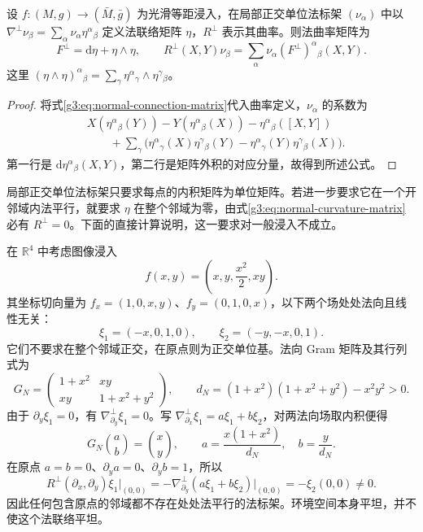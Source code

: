 \begin{proposition}\label{g3:prop:normal-curvature-matrix}
	设 \(f:(M,g)\to(\bar M,\bar g)\) 为光滑等距浸入，在局部正交单位法标架 \((\nu_\alpha)\) 中以 \(\nabla^\perp\nu_\beta=\sum_\alpha\nu_\alpha\eta^\alpha{}_\beta\) 定义法联络矩阵 \(\eta\)，\(R^\perp\) 表示其曲率。则法曲率矩阵为
	\begin{equation}\label{g3:eq:normal-curvature-matrix}
		F^\perp=\mathrm d\eta+\eta\wedge\eta,\qquad
		R^\perp(X,Y)\nu_\beta
			=\sum_\alpha\nu_\alpha(F^\perp)^\alpha{}_\beta(X,Y).
	\end{equation}
	这里 \((\eta\wedge\eta)^\alpha{}_\beta
	=\sum_\gamma\eta^\alpha{}_\gamma\wedge\eta^\gamma{}_\beta\)。
\end{proposition}
\begin{proof}
	将式\eqref{g3:eq:normal-connection-matrix}代入曲率定义，\(\nu_\alpha\) 的系数为
	\[
		\begin{aligned}
			&X(\eta^\alpha{}_\beta(Y))
				-Y(\eta^\alpha{}_\beta(X))
				-\eta^\alpha{}_\beta([X,Y])\\
			&\qquad+\sum_\gamma
				\bigl(\eta^\alpha{}_\gamma(X)\eta^\gamma{}_\beta(Y)
				-\eta^\alpha{}_\gamma(Y)\eta^\gamma{}_\beta(X)\bigr).
		\end{aligned}
	\]
	第一行是 \(\mathrm d\eta^\alpha{}_\beta(X,Y)\)，第二行是矩阵外积的对应分量，故得到所述公式。
\end{proof}

局部正交单位法标架只要求每点的内积矩阵为单位矩阵。若进一步要求它在一个开邻域内法平行，就要求 \(\eta\) 在整个邻域为零，由式\eqref{g3:eq:normal-curvature-matrix}必有 \(R^\perp=0\)。下面的直接计算说明，这一要求对一般浸入不成立。

\begin{example}\label{g3:exm:nonflat-normal-connection}
	在 \(\mathbb R^4\) 中考虑图像浸入
	\[
		f(x,y)=\left(x,y,\frac{x^2}{2},xy\right).
	\]
	其坐标切向量为 \(f_x=(1,0,x,y)\)、\(f_y=(0,1,0,x)\)，以下两个场处处法向且线性无关：
	\[
		\xi_1=(-x,0,1,0),\qquad
		\xi_2=(-y,-x,0,1).
	\]
	它们不要求在整个邻域正交，在原点则为正交单位基。法向 Gram 矩阵及其行列式为
	\[
		G_N=
		\begin{pmatrix}1+x^2&xy\\xy&1+x^2+y^2\end{pmatrix},
		\qquad
		d_N=(1+x^2)(1+x^2+y^2)-x^2y^2>0.
	\]
	由于 \(\partial_y\xi_1=0\)，有 \(\nabla^\perp_{\partial_y}\xi_1=0\)。写
	\(\nabla^\perp_{\partial_x}\xi_1=a\xi_1+b\xi_2\)，对两法向场取内积便得
	\[
		G_N\binom{a}{b}=\binom{x}{y},\qquad
		a=\frac{x(1+x^2)}{d_N},\quad b=\frac{y}{d_N}.
	\]
	在原点 \(a=b=0\)、\(\partial_ya=0\)、\(\partial_yb=1\)，所以
	\[
		R^\perp(\partial_x,\partial_y)\xi_1\big|_{(0,0)}
		=-\nabla^\perp_{\partial_y}(a\xi_1+b\xi_2)\big|_{(0,0)}
		=-\xi_2(0,0)\ne0.
	\]
	因此任何包含原点的邻域都不存在处处法平行的法标架。环境空间本身平坦，并不使这个法联络平坦。
\end{example}

